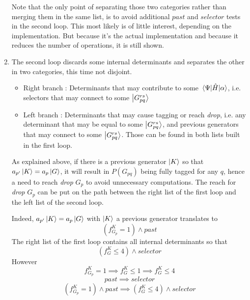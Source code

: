 \documentclass[./thesis.tex]{subfiles}
\begin{document}
\begin{enumerate}
Note that the only point of separating those two categories rather than merging them in the same list, is to avoid additional $past$ and $selector$ tests in the second loop.
This most likely is of little interest, depending on the implementation.
But because it's the actual implementation and because it reduces the number of operations, it is still shown.

\item
The second loop discards some internal determinants and separates the other in two categories, this time not disjoint.

\begin{itemize}
\item
Right branch : Determinants that may contribute to some $\mel{\Psi}{\hat{H}}{\alpha}$, i.e. selectors that may connect to some $\ket {G_{pq}^{rs}}$
\item
Left branch : Determinants that may cause tagging or reach \emph{drop}, i.e. any determinant that may be equal to some $\ket {G_{pq}^{rs}}$, and previous generators that may connect to some $\ket {G_{pq}^{rs}}$. Those can be found in both lists built in the first loop.
\end{itemize}

As explained above, if there is a previous generator $\ket K$ so that $a_{p'} \ket K = a_p \ket G$, it will result in $P(G_{pq})$ being fully tagged for any $q$, hence a need to reach \emph{drop} $G_p$ to avoid unnecessary computations.
The reach for \emph{drop} $G_p$ can be put on the path between the right list of the first loop and the left list of the second loop.

Indeed, $a_{p'} \ket K = a_p \ket G$ with $\ket K$ a previous generator translates to
\begin{equation}
(f^K_{G_{p}} = 1) \wedge past
\end{equation}
The right list of the first loop contains all internal determinants so that
\begin{equation}
(f^K_G \leq 4) \wedge selector
\end{equation}
However 
\begin{equation}
f^K_{G_{p}} = 1 \implies f^K_G \leq 1 \implies f^K_G \leq 4
\end{equation}
\begin{equation}
past \implies selector
\end{equation}
\begin{equation}
(f^K_{G_{p}} = 1) \wedge past \implies (f^K_G \leq 4) \wedge selector
\end{equation}


\end{enumerate}
\end{document}
